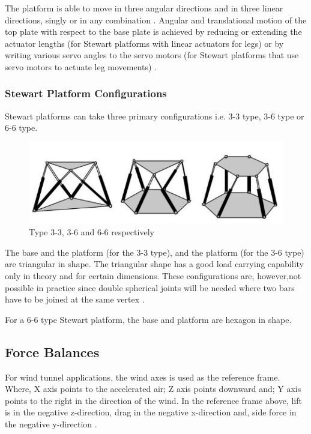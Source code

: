 The platform is able to move in three angular directions and in three linear directions, singly or in any combination \cite{stewart1965platform}. Angular and translational motion of the top plate with
respect to the base plate is achieved by reducing or extending the actuator lengths (for Stewart platforms with linear actuators for legs) or by writing various servo angles to the servo motors
(for Stewart platforms that use servo motors to actuate leg movements) \cite{iqbal_dynamic_2008}.

\subsubsection{Stewart Platform Configurations}
Stewart platforms can take three primary configurations i.e. 3-3 type, 3-6 type or 6-6 type.
\begin{center}
	\begin{figure}[H]
		\centering
		\includegraphics{Figures/stewart}
		\caption[Configurations]{Type 3-3, 3-6 and 6-6 respectively
			\cite{fernandes_design_nodate}}
	\end{figure}
\end{center}
The base and the platform (for the 3-3 type), and the platform (for the 3-6 type) are triangular in shape. The triangular shape has a good load carrying capability only in theory and for certain dimensions. These configurations are, however,not possible in practice since double spherical joints will be needed where two bars have to be joined at the same vertex
\cite{fernandes_design_nodate}.

For a 6-6 type Stewart platform, the base and platform are hexagon in shape.

\subsection{Force Balances}
For wind tunnel applications, the wind axes is used as the reference frame. Where, X axis points to the accelerated air; Z axis points downward and; Y axis points to the right in the direction of the wind. In the reference frame above, lift is in the negative z-direction, drag in the negative x-direction and, side force in the negative y-direction \cite{bueno2018design}.

